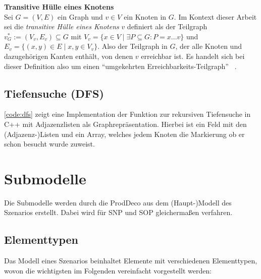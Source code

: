 \textbf{Transitive Hülle eines Knotens} \\
Sei $G = (V, E)$ ein Graph und $v \in V$ ein Knoten in $G$. Im Kontext
 dieser Arbeit sei die \textit{transitive Hülle eines Knotens} $v$ definiert
  als der Teilgraph $v^*_G := (V_v, E_v) \subseteq G$ 
  mit $V_v = \{x \in V \mid \exists P \subseteq G: P=x...v\}$ 
  und $E_v = \{ (x,y) \in E \mid x,y \in V_v \}$. 
  Also der Teilgraph in $G$, der alle Knoten und dazugehörigen Kanten enthält, von denen $v$ erreichbar ist. Es handelt sich bei dieser Definition also um einen \enquote{umgekehrten Erreichbarkeits-Teilgraph} ~\cite[S.~41--42]{Sandner.01.09.1998}.



\subsection{Tiefensuche (DFS)}

\autoref{code:dfs} zeigt eine Implementation der Funktion zur rekursiven Tiefensuche in C++ mit Adjazenzlisten als Graphrepräsentation. Hierbei ist  ein Feld mit den (Adjazenz-)Listen und  ein Array, welches jedem Knoten die Markierung ob er schon besucht wurde zuweist.




\section{Submodelle} \label{sec:submodelle}

Die Submodelle werden durch die \ac{ProdDeco} aus dem (Haupt-)Modell des Szenarios erstellt. Dabei wird für \ac{SNP} und \ac{SOP} gleichermaßen verfahren. 

\subsection{Elementtypen} \label{sec:elements}
Das Modell eines Szenarios beinhaltet Elemente mit verschiedenen Elementtypen, wovon die wichtigsten im Folgenden vereinfacht vorgestellt werden:

